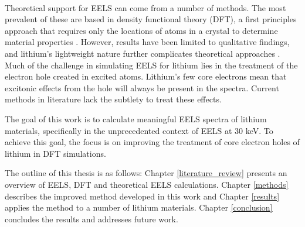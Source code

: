 \\
Theoretical support for EELS can come from a number of methods. The most prevalent of these are based in density functional theory (DFT), a first principles approach that requires only the locations of atoms in a crystal to determine material properties \cite{ks_1965, wien2k,elk,exciting, vasp}.  However, results have been limited to qualitative findings, and lithium's lightweight nature further complicates theoretical approaches \cite{mauchamp_ab_2006, mauchamp_local_2008}. Much of the challenge in simulating EELS for lithium lies in the treatment of the electron hole created in excited atoms.  Lithium's few core electrons mean that excitonic effects from the hole will always be present in the spectra.  Current methods in literature lack the subtlety to treat these effects. 

The goal of this work is to calculate meaningful EELS spectra of lithium materials, specifically in the unprecedented context of EELS at 30 keV. To achieve this goal, the focus is on improving the treatment of core electron holes of lithium in DFT simulations.  %

The outline of this thesis is as follows: Chapter \ref{literature_review} presents an overview of EELS, DFT and theoretical EELS calculations.  Chapter \ref{methods} describes the improved method developed in this work and Chapter \ref{results} applies the method to a number of lithium materials.  Chapter \ref{conclusion} concludes the results and addresses future work.


